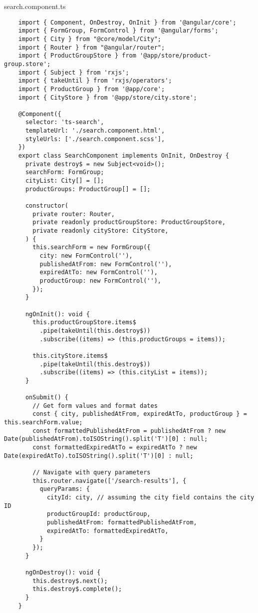search.component.ts
\lstset{style=ts}
\begin{lstlisting}
    import { Component, OnDestroy, OnInit } from '@angular/core';
    import { FormGroup, FormControl } from '@angular/forms';
    import { City } from "@core/model/City";
    import { Router } from "@angular/router";
    import { ProductGroupStore } from '@app/store/product-group.store';
    import { Subject } from 'rxjs';
    import { takeUntil } from 'rxjs/operators';
    import { ProductGroup } from '@app/core';
    import { CityStore } from '@app/store/city.store';
    
    @Component({
      selector: 'ts-search',
      templateUrl: './search.component.html',
      styleUrls: ['./search.component.scss'],
    })
    export class SearchComponent implements OnInit, OnDestroy {
      private destroy$ = new Subject<void>();
      searchForm: FormGroup;
      cityList: City[] = [];
      productGroups: ProductGroup[] = [];
    
      constructor(
        private router: Router,
        private readonly productGroupStore: ProductGroupStore,
        private readonly cityStore: CityStore,
      ) {
        this.searchForm = new FormGroup({
          city: new FormControl(''),
          publishedAtFrom: new FormControl(''),
          expiredAtTo: new FormControl(''),
          productGroup: new FormControl(''),
        });
      }
    
      ngOnInit(): void {
        this.productGroupStore.items$
          .pipe(takeUntil(this.destroy$))
          .subscribe((items) => (this.productGroups = items));
    
        this.cityStore.items$
          .pipe(takeUntil(this.destroy$))
          .subscribe((items) => (this.cityList = items));
      }
    
      onSubmit() {
        // Get form values and format dates
        const { city, publishedAtFrom, expiredAtTo, productGroup } = this.searchForm.value;
        const formattedPublishedAtFrom = publishedAtFrom ? new Date(publishedAtFrom).toISOString().split('T')[0] : null;
        const formattedExpiredAtTo = expiredAtTo ? new Date(expiredAtTo).toISOString().split('T')[0] : null;
    
        // Navigate with query parameters
        this.router.navigate(['/search-results'], {
          queryParams: {
            cityId: city, // assuming the city field contains the city ID
            productGroupId: productGroup,
            publishedAtFrom: formattedPublishedAtFrom,
            expiredAtTo: formattedExpiredAtTo,
          }
        });
      }
    
      ngOnDestroy(): void {
        this.destroy$.next();
        this.destroy$.complete();
      }
    }    
\end{lstlisting}

